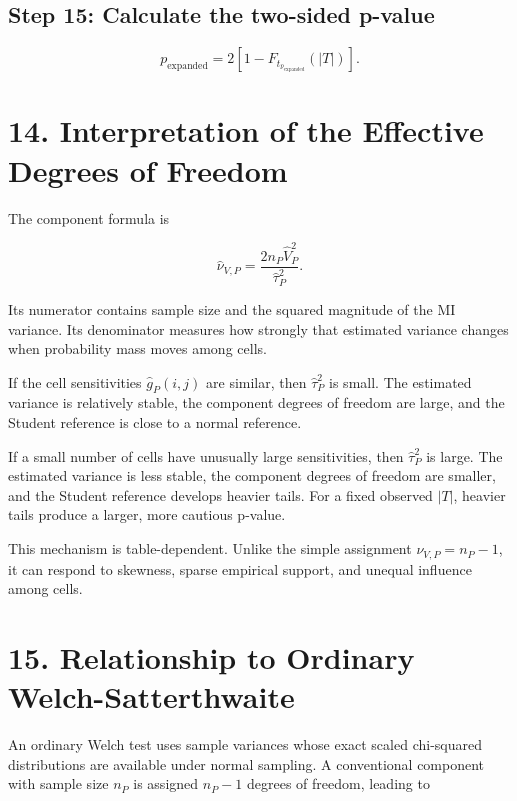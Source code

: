 \documentclass[
  11pt]{article}
\let\originalsection\section
\renewcommand{\section}{\clearpage\originalsection}
\begin{document}
\subsection{Step 15: Calculate the two-sided
p-value}\label{step-15-calculate-the-two-sided-p-value}

\begin{equation}
p_{\mathrm{expanded}}
=2\left[1-F_{t_{\widehat\nu_{\mathrm{expanded}}}}(|T|)\right].
\end{equation}

\section{14. Interpretation of the Effective Degrees of
Freedom}\label{interpretation-of-the-effective-degrees-of-freedom}

The component formula is

\begin{equation}
\widehat\nu_{V,P}
=\frac{2n_P\widehat V_P^2}{\widehat\tau_P^2}.
\end{equation}

Its numerator contains sample size and the squared magnitude of the MI
variance. Its denominator measures how strongly that estimated variance
changes when probability mass moves among cells.

If the cell sensitivities \(\widehat g_P(i,j)\) are similar, then
\(\widehat\tau_P^2\) is small. The estimated variance is relatively
stable, the component degrees of freedom are large, and the Student
reference is close to a normal reference.

If a small number of cells have unusually large sensitivities, then
\(\widehat\tau_P^2\) is large. The estimated variance is less stable,
the component degrees of freedom are smaller, and the Student reference
develops heavier tails. For a fixed observed \(|T|\), heavier tails
produce a larger, more cautious p-value.

This mechanism is table-dependent. Unlike the simple assignment
\(\nu_{V,P}=n_P-1\), it can respond to skewness, sparse empirical
support, and unequal influence among cells.

\section{15. Relationship to Ordinary
Welch-Satterthwaite}\label{relationship-to-ordinary-welch-satterthwaite}

An ordinary Welch test uses sample variances whose exact scaled
chi-squared distributions are available under normal sampling. A
conventional component with sample size \(n_P\) is assigned \(n_P-1\)
degrees of freedom, leading to
\end{document}
